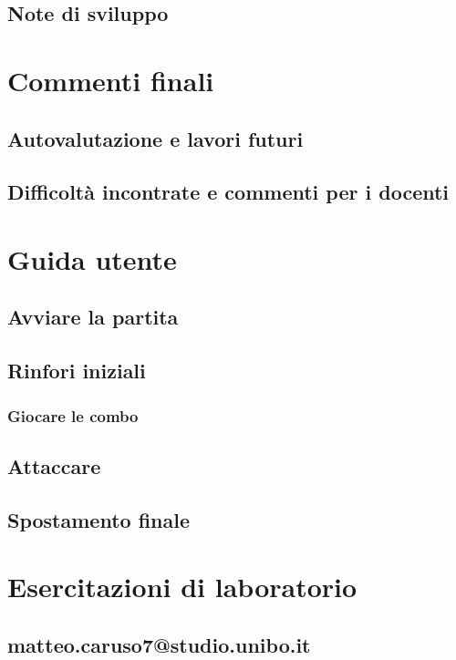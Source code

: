 \documentclass[a4paper,12pt]{report}
\begin{document}
\section{Note di sviluppo}

\chapter{Commenti finali}

\section{Autovalutazione e lavori futuri}

\section{Difficoltà incontrate e commenti per i docenti}

\appendix
\chapter{Guida utente}
\section{Avviare la partita}
\section{Rinfori iniziali}
\subsection{Giocare le combo}
\section{Attaccare}
\section{Spostamento finale}

\appendix
\chapter{Esercitazioni di laboratorio}

\section{matteo.caruso7@studio.unibo.it}
\end{document}
